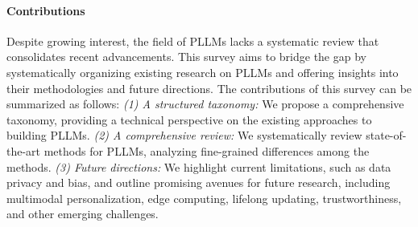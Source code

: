 



\paragraph{Contributions} Despite growing interest, the field of PLLMs lacks a systematic review that consolidates recent advancements.
This survey aims to bridge the gap by systematically organizing existing research on PLLMs and offering insights into their methodologies and future directions. The contributions of this survey can be summarized as follows:
\textit{(1) A structured taxonomy:} We propose a comprehensive taxonomy, providing a technical perspective on the existing approaches to building PLLMs.
\textit{(2) A comprehensive review:} We systematically review state-of-the-art methods for PLLMs, analyzing fine-grained differences among the methods.
\textit{(3) Future directions:} We highlight current limitations, such as data privacy and bias, and outline promising avenues for future research, including multimodal personalization, edge computing, lifelong updating, trustworthiness, and other emerging challenges.


